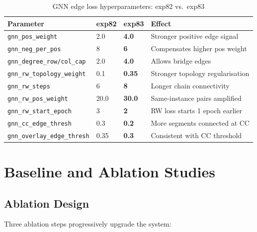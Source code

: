 \documentclass[11pt,a4paper]{article}
\begin{document}
\begin{table}[H]
\centering
\caption{GNN edge loss hyperparameters: exp82 vs.\ exp83}
\begin{tabular}{llll}
\toprule
Parameter & exp82 & \textbf{exp83} & Effect \\
\midrule
\texttt{gnn\_pos\_weight}          & 2.0 & \textbf{4.0}  & Stronger positive edge signal \\
\texttt{gnn\_neg\_per\_pos}        & 8   & \textbf{6}    & Compensates higher pos weight \\
\texttt{gnn\_degree\_row/col\_cap} & 2.0 & \textbf{4.0}  & Allows bridge edges \\
\texttt{gnn\_rw\_topology\_weight} & 0.1 & \textbf{0.35} & Stronger topology regularisation \\
\texttt{gnn\_rw\_steps}            & 6   & \textbf{8}    & Longer chain connectivity \\
\texttt{gnn\_rw\_pos\_weight}      & 20.0& \textbf{30.0} & Same-instance pairs amplified \\
\texttt{gnn\_rw\_start\_epoch}     & 3   & \textbf{2}    & RW loss starts 1 epoch earlier \\
\texttt{gnn\_cc\_edge\_thresh}     & 0.3 & \textbf{0.2}  & More segments connected at CC \\
\texttt{gnn\_overlay\_edge\_thresh}& 0.35& \textbf{0.3}  & Consistent with CC threshold \\
\bottomrule
\end{tabular}
\end{table}

\section{Baseline and Ablation Studies}
\label{sec:ablation}

\subsection{Ablation Design}

Three ablation steps progressively upgrade the system:
\end{document}

